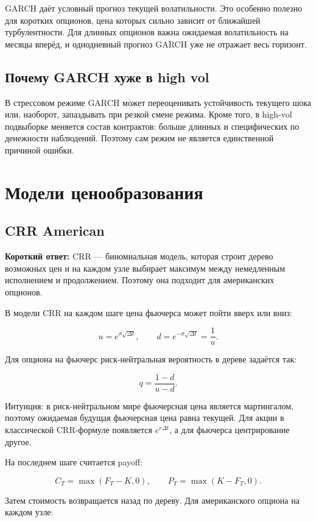 \documentclass[11pt,a4paper]{article}
\newcommand{\answerbox}[1]{%
  \noindent\colorbox{softblue}{%
    \parbox{\dimexpr\linewidth-2\fboxsep\relax}{\textbf{Короткий ответ:} #1}%
  }\par\vspace{0.2em}
}
\begin{document}
GARCH даёт условный прогноз текущей волатильности. Это особенно полезно для коротких опционов, цена которых сильно зависит от ближайшей турбулентности. Для длинных опционов важна ожидаемая волатильность на месяцы вперёд, и однодневный прогноз GARCH уже не отражает весь горизонт.

\subsection{Почему GARCH хуже в high vol}

В стрессовом режиме GARCH может переоценивать устойчивость текущего шока или, наоборот, запаздывать при резкой смене режима. Кроме того, в high-vol подвыборке меняется состав контрактов: больше длинных и специфических по денежности наблюдений. Поэтому сам режим не является единственной причиной ошибки.

\section{Модели ценообразования}

\subsection{CRR American}

\answerbox{CRR --- биномиальная модель, которая строит дерево возможных цен и на каждом узле выбирает максимум между немедленным исполнением и продолжением. Поэтому она подходит для американских опционов.}

В модели CRR на каждом шаге цена фьючерса может пойти вверх или вниз:

\[
u=e^{\sigma\sqrt{\Delta t}}, \qquad d=e^{-\sigma\sqrt{\Delta t}}=\frac{1}{u}.
\]

Для опциона на фьючерс риск-нейтральная вероятность в дереве задаётся так:

\[
q=\frac{1-d}{u-d}.
\]

Интуиция: в риск-нейтральном мире фьючерсная цена является мартингалом, поэтому ожидаемая будущая фьючерсная цена равна текущей. Для акции в классической CRR-формуле появляется $e^{r\Delta t}$, а для фьючерса центрирование другое.

На последнем шаге считается payoff:

\[
C_T=\max(F_T-K,0), \qquad P_T=\max(K-F_T,0).
\]

Затем стоимость возвращается назад по дереву. Для американского опциона на каждом узле:
\end{document}
